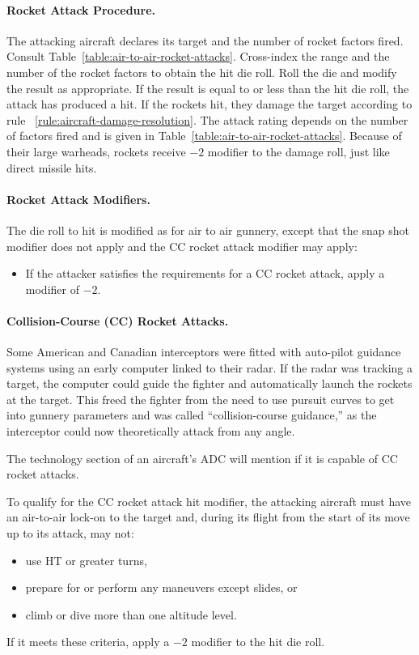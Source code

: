 \begin{advancedrules}
{\begin{itemize}
\end{itemize}

\paragraph{Rocket Attack Procedure.} The attacking aircraft declares its target and the number of rocket factors fired. Consult Table~\ref{table:air-to-air-rocket-attacks}. Cross-index the range and the number of the rocket factors to obtain the hit die roll. Roll the die and modify the result as appropriate. If the result is equal to or less than the hit die roll, the attack has produced a hit. If the rockets hit, they damage the target according to rule ~\ref{rule:aircraft-damage-resolution}. The attack rating depends on the number of factors fired and is given in Table~\ref{table:air-to-air-rocket-attacks}. Because of their large warheads, rockets receive $-2$ modifier to the damage roll, just like direct missile hits.

\paragraph{Rocket Attack Modifiers.} 
The die roll to hit is modified as for air to air gunnery, except that the snap shot modifier does not apply and the CC rocket attack modifier may apply:

\begin{itemize}
    \item {} If the attacker satisfies the requirements for a CC rocket attack, apply a modifier of $-2$.
\end{itemize}

\paragraph{Collision-Course (CC) Rocket Attacks.} Some American and Canadian interceptors were fitted with auto-pilot guidance systems using an early computer linked to their radar. If the radar was tracking a target, the computer could guide the fighter and automatically launch the rockets at the target. This freed the fighter from the need to use pursuit curves to get into gunnery parameters and was called “collision-course guidance,” as the interceptor could now theoretically attack from any angle.

The technology section of an aircraft’s ADC will mention if it is capable of CC rocket attacks.

To qualify for the CC rocket attack hit modifier, the attacking aircraft must have an air-to-air lock-on to the target and, during its flight from the start of its move up to its attack, may not:
\begin{itemize}
    \item use HT or greater turns,
    \item prepare for or perform any maneuvers except slides, or
    \item climb or dive more than one altitude level.
\end{itemize}
If it meets these criteria, apply a $-2$ modifier to the hit die roll.
}


\end{advancedrules}
